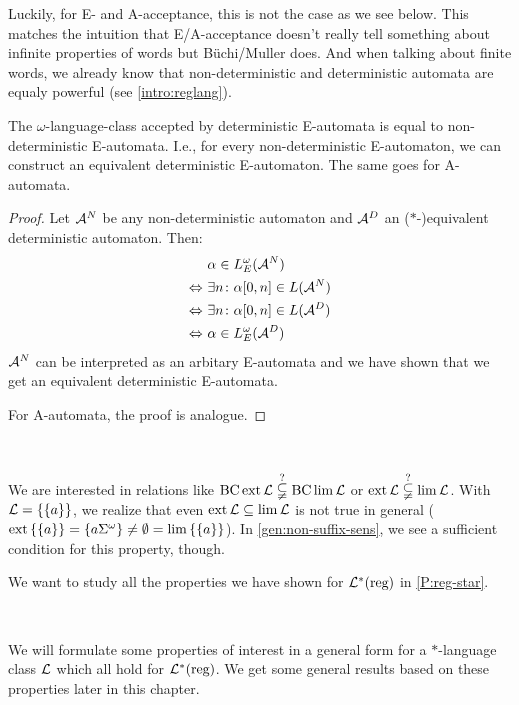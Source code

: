 Luckily, for E- and A-acceptance, this is not the case as we see below. This matches the intuition that E/A-acceptance doesn't really tell something about infinite properties of words but Büchi/Muller does. And when talking about finite words, we already know that non-deterministic and deterministic automata are equaly powerful (see \cref{intro:reglang}).

\begin{lemma}
\label{gen:e-determinism}
The $\omega$-language-class accepted by deterministic E-automata is equal to non-deterministic E-automata. I.e., for every non-deterministic E-automaton, we can construct an equivalent deterministic E-automaton. The same goes for A-automata.
\begin{proof} Let $\mathcal{A}^N$ be any non-deterministic automaton and $\mathcal{A}^D$ an ($*$-)equivalent deterministic automaton. Then:
\begin{align*}
& \alpha \in L^{\omega}_E(\mathcal{A}^N) \\
\Leftrightarrow \ & \exists n \colon \alpha[0,n] \in L(\mathcal{A}^N) \\
\Leftrightarrow \ & \exists n \colon \alpha[0,n] \in L(\mathcal{A}^D) \\
\Leftrightarrow \ & \alpha \in L^{\omega}_E(\mathcal{A}^D)
\end{align*}
$\mathcal{A}^N$ can be interpreted as an arbitary E-automata and we have shown that we get an equivalent deterministic E-automata.

For A-automata, the proof is analogue.
\end{proof}
\end{lemma}

\

We are interested in relations like $\operatorname{BC} \operatorname{ext} \mathcal{L} \overset{?}{\subsetneqq} \operatorname{BC} \lim \mathcal{L}$ or $\operatorname{ext} \mathcal{L} \overset{?}{\subsetneqq} \lim \mathcal{L}$. With $\Lang = \Set{\Set{a}}$, we realize that even $\operatorname{ext} \mathcal{L} \subseteq \lim \mathcal{L}$ is not true in general ($\ext \Set{\Set{a}} = \Set{a \Sigma^\omega} \neq \emptyset = \lim \Set{\Set{a}}$). In \cref{gen:non-suffix-sens}, we see a sufficient condition for this property, though.

We want to study all the properties we have shown for $\mathcal{L}^*(\text{reg})$ in \cref{P:reg-star}.

\

We will formulate some properties of interest in a general form for a $*$-language class $\mathcal{L}$ which all hold for $\mathcal{L}^*(\text{reg})$. We get some general results based on these properties later in this chapter. %

